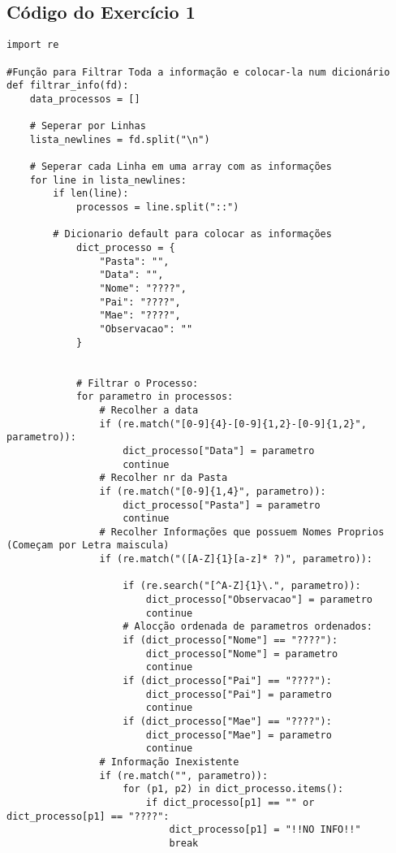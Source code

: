 \documentclass[11pt,a4paper]{report}%
\begin{document}
\subsection{Código do Exercício 1} \label{subsec:pyEx1}
\begin{verbatim}
import re

#Função para Filtrar Toda a informação e colocar-la num dicionário
def filtrar_info(fd):
    data_processos = []

    # Seperar por Linhas
    lista_newlines = fd.split("\n")

    # Seperar cada Linha em uma array com as informações
    for line in lista_newlines:
        if len(line):
            processos = line.split("::")

        # Dicionario default para colocar as informações
            dict_processo = {
                "Pasta": "",
                "Data": "",
                "Nome": "????",
                "Pai": "????",
                "Mae": "????",
                "Observacao": ""
            }


            # Filtrar o Processo:
            for parametro in processos:
                # Recolher a data
                if (re.match("[0-9]{4}-[0-9]{1,2}-[0-9]{1,2}", parametro)):
                    dict_processo["Data"] = parametro
                    continue
                # Recolher nr da Pasta
                if (re.match("[0-9]{1,4}", parametro)):
                    dict_processo["Pasta"] = parametro
                    continue
                # Recolher Informações que possuem Nomes Proprios (Começam por Letra maiscula)
                if (re.match("([A-Z]{1}[a-z]* ?)", parametro)):

                    if (re.search("[^A-Z]{1}\.", parametro)):
                        dict_processo["Observacao"] = parametro
                        continue
                    # Alocção ordenada de parametros ordenados:
                    if (dict_processo["Nome"] == "????"):
                        dict_processo["Nome"] = parametro
                        continue
                    if (dict_processo["Pai"] == "????"):
                        dict_processo["Pai"] = parametro
                        continue
                    if (dict_processo["Mae"] == "????"):
                        dict_processo["Mae"] = parametro
                        continue
                # Informação Inexistente
                if (re.match("", parametro)):
                    for (p1, p2) in dict_processo.items():
                        if dict_processo[p1] == "" or dict_processo[p1] == "????":
                            dict_processo[p1] = "!!NO INFO!!"
                            break


\end{verbatim}
\end{document}
